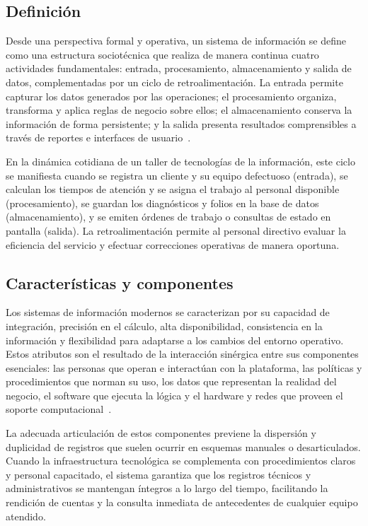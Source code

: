 \subsection{Definición}

Desde una perspectiva formal y operativa, un sistema de información se define como una estructura sociotécnica que realiza de manera continua cuatro actividades fundamentales: entrada, procesamiento, almacenamiento y salida de datos, complementadas por un ciclo de retroalimentación. La entrada permite capturar los datos generados por las operaciones; el procesamiento organiza, transforma y aplica reglas de negocio sobre ellos; el almacenamiento conserva la información de forma persistente; y la salida presenta resultados comprensibles a través de reportes e interfaces de usuario~\cite{laudon2020management, stair2018principles}.

En la dinámica cotidiana de un taller de tecnologías de la información, este ciclo se manifiesta cuando se registra un cliente y su equipo defectuoso (entrada), se calculan los tiempos de atención y se asigna el trabajo al personal disponible (procesamiento), se guardan los diagnósticos y folios en la base de datos (almacenamiento), y se emiten órdenes de trabajo o consultas de estado en pantalla (salida). La retroalimentación permite al personal directivo evaluar la eficiencia del servicio y efectuar correcciones operativas de manera oportuna.

\subsection{Características y componentes}

Los sistemas de información modernos se caracterizan por su capacidad de integración, precisión en el cálculo, alta disponibilidad, consistencia en la información y flexibilidad para adaptarse a los cambios del entorno operativo. Estos atributos son el resultado de la interacción sinérgica entre sus componentes esenciales: las personas que operan e interactúan con la plataforma, las políticas y procedimientos que norman su uso, los datos que representan la realidad del negocio, el software que ejecuta la lógica y el hardware y redes que proveen el soporte computacional~\cite{laudon2020management, stair2018principles}.

La adecuada articulación de estos componentes previene la dispersión y duplicidad de registros que suelen ocurrir en esquemas manuales o desarticulados. Cuando la infraestructura tecnológica se complementa con procedimientos claros y personal capacitado, el sistema garantiza que los registros técnicos y administrativos se mantengan íntegros a lo largo del tiempo, facilitando la rendición de cuentas y la consulta inmediata de antecedentes de cualquier equipo atendido.


